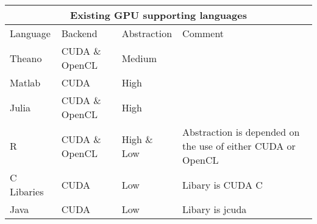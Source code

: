 \begin{tabular}{ |p{3cm}||p{3cm}|p{3cm}|p{3cm}|  }
 \hline
 \multicolumn{4}{|c|}{Existing GPU supporting languages} \\
 \hline
 Language & Backend &Abstraction &Comment\\
 \hline
 Theano&        CUDA \& OpenCL& Medium&\\
 \hline
 Matlab&        CUDA&           High&\\
 \hline
 Julia&         CUDA \& OpenCL& High&\\
 \hline
 R&             CUDA \& OpenCL& High \& Low&   Abstraction is depended on the use of either CUDA or OpenCL\\
 \hline
 C Libaries&    CUDA&           Low&            Libary is CUDA C\\
 \hline
 Java&          CUDA&           Low&            Libary is jcuda\\
 \hline
\end{tabular}